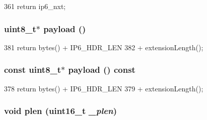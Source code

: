\begin{DoxyCode}
361 { return ip6_nxt; }
\end{DoxyCode}
\hypertarget{structNet_1_1Ip6Hdr_a79ce21e3572e587b71de7af1ac640b6f}{
\subsubsection[{payload}]{\setlength{\rightskip}{0pt plus 5cm}uint8\_\-t$\ast$ payload ()}}
\label{structNet_1_1Ip6Hdr_a79ce21e3572e587b71de7af1ac640b6f}



\begin{DoxyCode}
381                        { return bytes() + IP6_HDR_LEN
382                                 + extensionLength(); }
\end{DoxyCode}
\hypertarget{structNet_1_1Ip6Hdr_a5f0d069ddb9d067af9e94963bd1fc7a2}{
\subsubsection[{payload}]{\setlength{\rightskip}{0pt plus 5cm}const uint8\_\-t$\ast$ payload () const}}
\label{structNet_1_1Ip6Hdr_a5f0d069ddb9d067af9e94963bd1fc7a2}



\begin{DoxyCode}
378                                    { return bytes() + IP6_HDR_LEN
379                                             + extensionLength(); }
\end{DoxyCode}
\hypertarget{structNet_1_1Ip6Hdr_a081a2967518430d101328245d43d3be5}{
\subsubsection[{plen}]{\setlength{\rightskip}{0pt plus 5cm}void plen (uint16\_\-t {\em \_\-plen})}}
\label{structNet_1_1Ip6Hdr_a081a2967518430d101328245d43d3be5}



